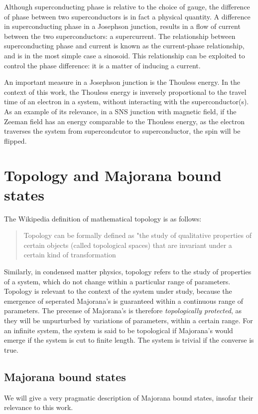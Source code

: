 		Although superconducting phase is relative to the choice of gauge, the difference of phase between two superconductors is in fact a physical quantity.
		A difference in superconducting phase in a Josephson junction, results in a flow of current between the two superconductors: a supercurrent.
		The relationship between superconducting phase and current is known as the current-phase relationship, and is in the most simple case a sinosoid.
		This relationship can be exploited to control the phase difference: it is a matter of inducing a current.

		An important measure in a Josephson junction is the Thouless energy.
		In the context of this work, the Thouless energy is inversely proportional to the travel time of an electron in a system, without interacting with the superconductor(s).
		As an example of its relevance, in a SNS junction with magnetic field, if the Zeeman field has an energy comparable to the Thouless energy, as the electron traverses the system from supercondcutor to superconductor, the spin will be flipped.
		
\section{Topology and Majorana bound states}

	The Wikipedia definition of mathematical topology is as follows:
	
	\begin{quote}Topology can be formally defined as "the study of qualitative properties of certain objects (called topological spaces) that are invariant under a certain kind of transformation
	\cite{noauthor_topology_2018}
	\end{quote}

	Similarly, in condensed matter physics, topology refers to the study of properties of a system, which do not change within a particular range of parameters.
	Topology is relevant to the context of the system under study, because the emergence of seperated Majorana's is guaranteed within a continuous range of parameters.
	The precense of Majorana's is therefore \emph{topologically protected}, as they will be unpurturbed by variations of parameters, within a certain range.
	For an infinite system, the system is said to be topological if Majorana's would emerge if the system is cut to finite length.
	The system is trivial if the converse is true.

	\subsection{Majorana bound states}
		We will give a very pragmatic description of Majorana bound states, insofar their relevance to this work.

